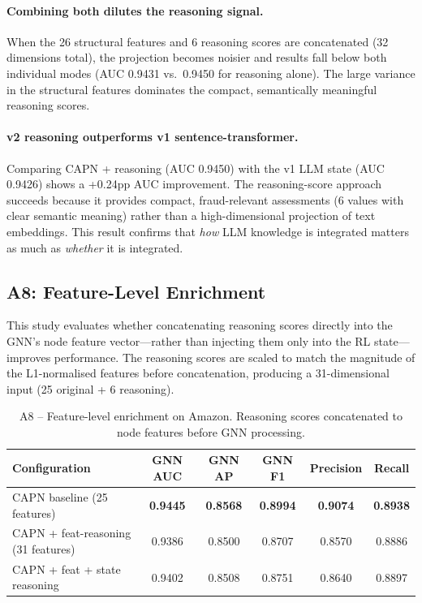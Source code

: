 \paragraph{Combining both dilutes the reasoning signal.}
When the 26 structural features and 6 reasoning scores are concatenated (32 dimensions total), the projection becomes noisier and results fall below both individual modes (AUC 0.9431 vs.\ 0.9450 for reasoning alone). The large variance in the structural features dominates the compact, semantically meaningful reasoning scores.

\paragraph{v2 reasoning outperforms v1 sentence-transformer.}
Comparing CAPN + reasoning (AUC 0.9450) with the v1 LLM state (AUC 0.9426) shows a +0.24pp AUC improvement. The reasoning-score approach succeeds because it provides compact, fraud-relevant assessments (6 values with clear semantic meaning) rather than a high-dimensional projection of text embeddings. This result confirms that \emph{how} LLM knowledge is integrated matters as much as \emph{whether} it is integrated.

\subsection{A8: Feature-Level Enrichment}
\label{sec:a8-feature}

This study evaluates whether concatenating reasoning scores directly into the GNN's node feature vector---rather than injecting them only into the RL state---improves performance. The reasoning scores are scaled to match the magnitude of the L1-normalised features before concatenation, producing a 31-dimensional input (25 original + 6 reasoning).

\begin{table}[h!]
\centering
\begin{tabular}{lccccc}
\toprule
\textbf{Configuration} & \textbf{GNN AUC} & \textbf{GNN AP} & \textbf{GNN F1} & \textbf{Precision} & \textbf{Recall} \\
\midrule
CAPN baseline (25 features) & \textbf{0.9445} & \textbf{0.8568} & \textbf{0.8994} & \textbf{0.9074} & \textbf{0.8938} \\
CAPN + feat-reasoning (31 features) & 0.9386 & 0.8500 & 0.8707 & 0.8570 & 0.8886 \\
CAPN + feat + state reasoning & 0.9402 & 0.8508 & 0.8751 & 0.8640 & 0.8897 \\
\bottomrule
\end{tabular}
\caption{A8 -- Feature-level enrichment on Amazon. Reasoning scores concatenated to node features before GNN processing.}
\label{tab:a8-feature}
\end{table}

